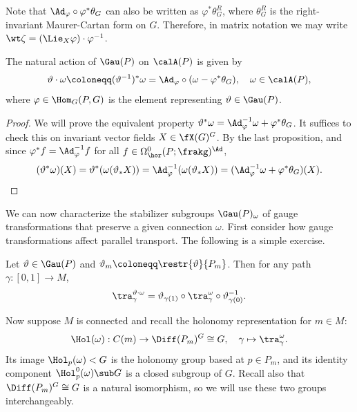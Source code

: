 \begin{rem}
    Note that $\Ad_\varphi\circ \varphi^\ast\theta_G$ can also be written as $\varphi^\ast\theta_G^R$, where $\theta_G^R$ is the right-invariant Maurer-Cartan form on $G$. Therefore, in matrix notation we may write $\wt\zeta=(\Lie_X\varphi)\cdot \varphi^{-1}$.
\end{rem}

\begin{prop}\label{prop action of Gau(P) on calA(P)}
    The natural action of $\Gau(P)$ on $\calA(P)$ is given by
    \[\vartheta\cdot\omega\coloneqq (\vartheta^{-1})^\ast\omega=\Ad_\varphi \circ (\omega-\varphi^\ast \theta_G),\quad \omega\in\calA(P),\]
    where $\varphi\in \Hom_G(P,G)$ is the element representing $\vartheta\in \Gau(P)$.
\end{prop}
\begin{proof}
    We will prove the equivalent property $\vartheta^\ast\omega=\Ad_\varphi^{-1}\omega+\varphi^\ast\theta_G$. It suffices to check this on invariant vector fields $X\in \fX(G)^G$. By the last proposition, and since $\varphi^\ast f=\Ad_\varphi^{-1}f$ for all $f\in \Omega^0_{\hor}(P;\frakg)^\Ad$, 
    \[(\vartheta^\ast\omega)(X)=\vartheta^\ast(\omega(\vartheta_\ast X))=\Ad_\varphi^{-1}(\omega(\vartheta_\ast X))=(\Ad_\varphi^{-1}\omega+\varphi^\ast\theta_G)(X).\]
\end{proof}

We can now characterize the stabilizer subgroups $\Gau(P)_\omega$ of gauge transformations that preserve a given connection $\omega$. First consider how gauge transformations affect parallel transport. The following is a simple exercise.

\begin{lem}\label{lem 31794}
    Let $\vartheta\in\Gau(P)$ and $\vartheta_m\coloneqq\restr{\vartheta}{P_m}$. Then for any path $\gamma:[0,1]\to M$, 
    \[\tra_{\gamma}^{\vartheta\cdot\omega}=\vartheta_{\gamma(1)}\circ\tra_\gamma^\omega \circ\vartheta_{\gamma(0)}^{-1}.\]
\end{lem}

Now suppose $M$ is connected and recall the holonomy representation for $m\in M$:
\[\Hol(\omega):C(m)\to \Diff(P_m)^G\cong G,\quad \gamma\mapsto \tra_\gamma^\omega.\]
Its image $\Hol_p(\omega)< G$ is the holonomy group based at $p\in P_m$, and its identity component $\Hol^0_p(\omega)\sub G$ is a closed subgroup of $G$. Recall also that $\Diff(P_m)^G\cong G$ is a natural isomorphism, so we will use these two groups interchangeably.

